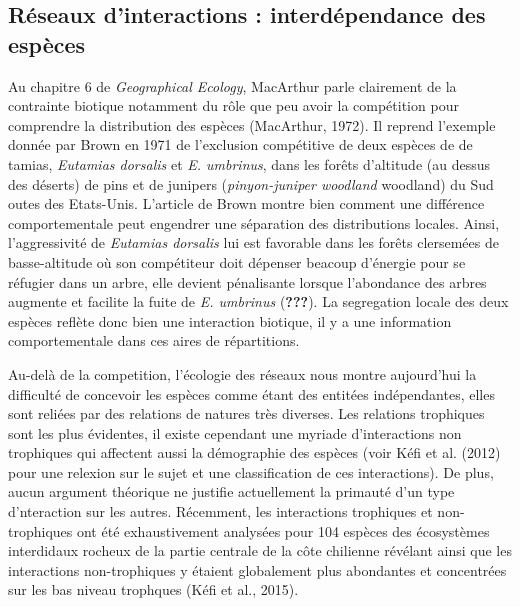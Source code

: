\subsection*{Réseaux d'interactions : interdépendance des
espèces}\label{ruxe9seaux-dinteractions-interduxe9pendance-des-espuxe8ces}

Au chapitre 6 de \emph{Geographical Ecology}, MacArthur parle clairement
de la contrainte biotique notamment du rôle que peu avoir la compétition
pour comprendre la distribution des espèces (MacArthur, 1972). Il
reprend l'exemple donnée par Brown en 1971 de l'exclusion compétitive de
deux espèces de de tamias, \emph{Eutamias dorsalis} et \emph{E.
umbrinus}, dans les forêts d'altitude (au dessus des déserts) de pins et
de junipers (\emph{pinyon-juniper woodland} woodland) du Sud outes des
Etats-Unis. L'article de Brown montre bien comment une différence
comportementale peut engendrer une séparation des distributions locales.
Ainsi, l'aggressivité de \emph{Eutamias dorsalis} lui est favorable dans
les forêts clersemées de basse-altitude où son compétiteur doit dépenser
beacoup d'énergie pour se réfugier dans un arbre, elle devient
pénalisante lorsque l'abondance des arbres augmente et facilite la fuite
de \emph{E. umbrinus} ({\textbf{???}}). La segregation locale des deux
espèces reflète donc bien une interaction biotique, il y a une
information comportementale dans ces aires de répartitions.

Au-delà de la competition, l'écologie des réseaux nous montre
aujourd'hui la difficulté de concevoir les espèces comme étant des
entitées indépendantes, elles sont reliées par des relations de natures
très diverses. Les relations trophiques sont les plus évidentes, il
existe cependant une myriade d'interactions non trophiques qui affectent
aussi la démographie des espèces (voir Kéfi et al. (2012) pour une
relexion sur le sujet et une classification de ces interactions). De
plus, aucun argument théorique ne justifie actuellement la primauté d'un
type d'nteraction sur les autres. Récemment, les interactions trophiques
et non-trophiques ont été exhaustivement analysées pour 104 espèces des
écosystèmes interdidaux rocheux de la partie centrale de la côte
chilienne révélant ainsi que les interactions non-trophiques y étaient
globalement plus abondantes et concentrées sur les bas niveau trophques
(Kéfi et al., 2015).

